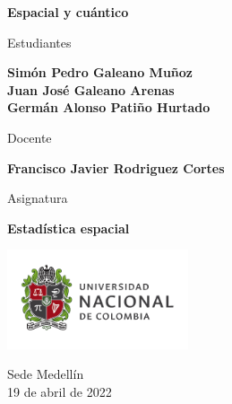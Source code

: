 \begin{titlepage}
   \Large{
   \begin{center}
       \vspace*{1cm}

       \textbf{Espacial y cuántico}

            
       \vspace{1.5cm}
       
       Estudiantes
       
       \vspace{0.5cm}
        
       \textbf{Simón Pedro Galeano Muñoz} \\
       \textbf{Juan José Galeano Arenas} \\
       \textbf{Germán Alonso Patiño Hurtado} \\

              \vspace{1cm}
       
       Docente
       
       \vspace{0.5cm}

       \textbf{Francisco Javier Rodriguez Cortes}
       
       \vspace{0.4cm}

       \vspace{1.4cm}
       
       Asignatura
       
       \vspace{0.5cm}

       \textbf{Estadística espacial}

       \vfill

            
       \vspace{0.4cm}
     
       \includegraphics[width=0.4\textwidth]{logounal.png}
            
       Sede Medellín\\
       19 de abril de 2022
       
   \end{center}
   }
\end{titlepage}